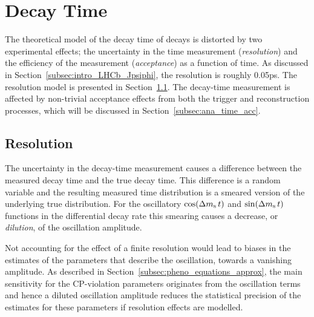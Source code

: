 \section{Decay Time}
\label{sec:ana_time}

The theoretical model of the decay time of \BstoJpsiKK{} decays is distorted by two experimental effects; the uncertainty in the time
measurement (\emph{resolution}) and the efficiency of the measurement (\emph{acceptance}) as a function of time. As discussed in
Section~\ref{subsec:intro_LHCb_Jpsiphi}, the resolution is roughly 0.05\unitsp{}ps. The resolution model is presented in
Section~\ref{subsec:ana_time_res}. The decay-time measurement is affected by non-trivial acceptance effects from both the trigger and
reconstruction processes, which will be discussed in Section~\ref{subsec:ana_time_acc}.


\subsection{Resolution}
\label{subsec:ana_time_res}

The uncertainty in the decay-time measurement causes a difference between the measured decay time and the true decay time. This difference
is a random variable and the resulting measured time distribution is a smeared version of the underlying true distribution. For the
oscillatory $\cos\!\left(\Delta m_\text{s}\, t\right)$ and $\sin\!\left(\Delta m_\text{s}\, t\right)$ functions in the differential decay rate this smearing causes a decrease, or \emph{dilution}, of the
oscillation amplitude.

Not accounting for the effect of a finite resolution would lead to biases in the estimates of the parameters that describe the oscillation,
towards a vanishing amplitude. As described in Section~\ref{subsec:pheno_equations_approx}, the main sensitivity for the CP-violation
parameters originates from the oscillation terms and hence a diluted oscillation amplitude reduces the statistical precision of the
estimates for these parameters if resolution effects are modelled.

